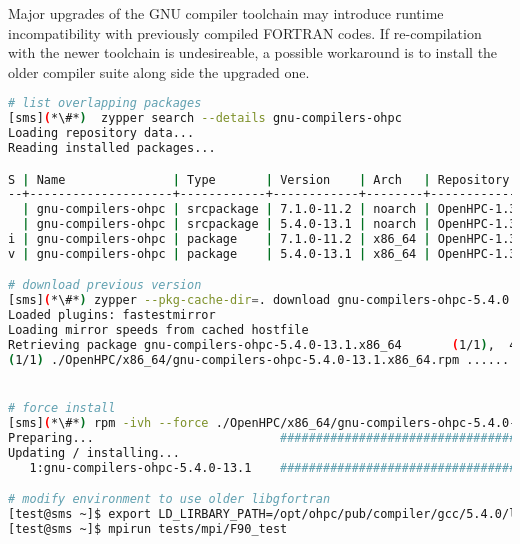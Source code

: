 \begin{center}
\begin{tcolorbox}[]
\small Major upgrades of the GNU compiler toolchain may introduce runtime 
incompatibility with previously compiled FORTRAN codes. If re-compilation with the 
newer toolchain is undesireable, a possible workaround is to install the older 
compiler suite along side the upgraded one.

\begin{lstlisting}[language=bash,keywords={}]
# list overlapping packages
[sms](*\#*)  zypper search --details gnu-compilers-ohpc
Loading repository data...
Reading installed packages...

S | Name               | Type       | Version    | Arch   | Repository                        
--+--------------------+------------+------------+--------+-----------------------------------
  | gnu-compilers-ohpc | srcpackage | 7.1.0-11.2 | noarch | OpenHPC-1.3 - Updates             
  | gnu-compilers-ohpc | srcpackage | 5.4.0-13.1 | noarch | OpenHPC-1.3 - Base                
i | gnu-compilers-ohpc | package    | 7.1.0-11.2 | x86_64 | OpenHPC-1.3 - Updates             
v | gnu-compilers-ohpc | package    | 5.4.0-13.1 | x86_64 | OpenHPC-1.3 - Base                

# download previous version
[sms](*\#*) zypper --pkg-cache-dir=. download gnu-compilers-ohpc-5.4.0
Loaded plugins: fastestmirror
Loading mirror speeds from cached hostfile
Retrieving package gnu-compilers-ohpc-5.4.0-13.1.x86_64       (1/1),  43.9 MiB (233.1 MiB unpacked)
(1/1) ./OpenHPC/x86_64/gnu-compilers-ohpc-5.4.0-13.1.x86_64.rpm .............................[done]


# force install
[sms](*\#*) rpm -ivh --force ./OpenHPC/x86_64/gnu-compilers-ohpc-5.4.0-13.1.x86_64.rpm
Preparing...                          ################################# [100%]
Updating / installing...
   1:gnu-compilers-ohpc-5.4.0-13.1    ################################# [100%]

# modify environment to use older libgfortran
[test@sms ~]$ export LD_LIRBARY_PATH=/opt/ohpc/pub/compiler/gcc/5.4.0/lib64:${LD_LIBRARY_PATH}
[test@sms ~]$ mpirun tests/mpi/F90_test
\end{lstlisting}
\end{tcolorbox}
\end{center}
